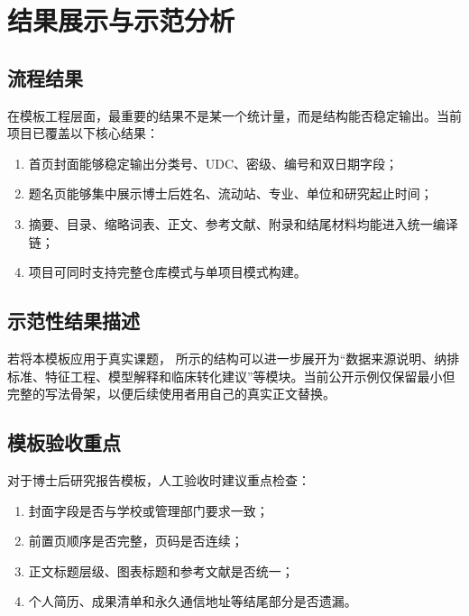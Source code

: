 \chapter{结果展示与示范分析}

\section{流程结果}

在模板工程层面，最重要的结果不是某一个统计量，而是结构能否稳定输出。当前项目已覆盖以下核心结果：

\begin{enumerate}
  \item 首页封面能够稳定输出分类号、UDC、密级、编号和双日期字段；
  \item 题名页能够集中展示博士后姓名、流动站、专业、单位和研究起止时间；
  \item 摘要、目录、缩略词表、正文、参考文献、附录和结尾材料均能进入统一编译链；
  \item 项目可同时支持完整仓库模式与单项目模式构建。
\end{enumerate}

\section{示范性结果描述}

若将本模板应用于真实课题， 所示的结构可以进一步展开为“数据来源说明、纳排标准、特征工程、模型解释和临床转化建议”等模块。当前公开示例仅保留最小但完整的写法骨架，以便后续使用者用自己的真实正文替换。

\section{模板验收重点}

对于博士后研究报告模板，人工验收时建议重点检查：

\begin{enumerate}
  \item 封面字段是否与学校或管理部门要求一致；
  \item 前置页顺序是否完整，页码是否连续；
  \item 正文标题层级、图表标题和参考文献是否统一；
  \item 个人简历、成果清单和永久通信地址等结尾部分是否遗漏。
\end{enumerate}
